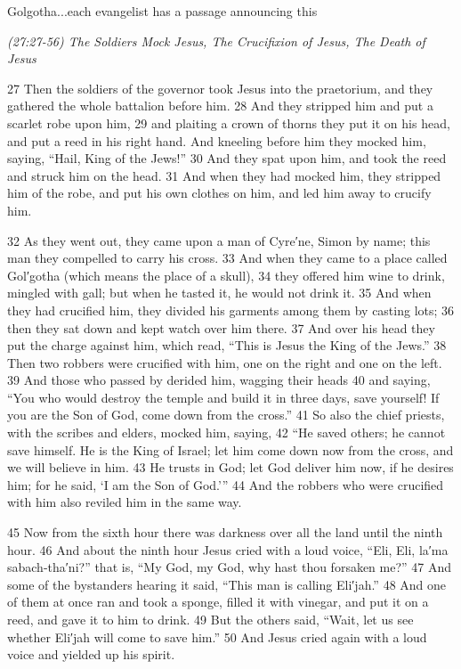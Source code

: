 \documentclass[letterpaper]{report}
\begin{document}
{\centering
	Golgotha...each evangelist has a passage announcing this
	
	\emph{(27:27-56) The Soldiers Mock Jesus, The Crucifixion of Jesus, The Death of Jesus}\\
}
\begin{multicols}{2}
27 Then the soldiers of the governor took Jesus into the praetorium, and they gathered the whole battalion before him. 28 And they stripped him and put a scarlet robe upon him, 29 and plaiting a crown of thorns they put it on his head, and put a reed in his right hand. And kneeling before him they mocked him, saying, “Hail, King of the Jews!” 30 And they spat upon him, and took the reed and struck him on the head. 31 And when they had mocked him, they stripped him of the robe, and put his own clothes on him, and led him away to crucify him.

32 As they went out, they came upon a man of Cyre′ne, Simon by name; this man they compelled to carry his cross. 33 And when they came to a place called Gol′gotha (which means the place of a skull), 34 they offered him wine to drink, mingled with gall; but when he tasted it, he would not drink it. 35 And when they had crucified him, they divided his garments among them by casting lots; 36 then they sat down and kept watch over him there. 37 And over his head they put the charge against him, which read, “This is Jesus the King of the Jews.” 38 Then two robbers were crucified with him, one on the right and one on the left. 39 And those who passed by derided him, wagging their heads 40 and saying, “You who would destroy the temple and build it in three days, save yourself! If you are the Son of God, come down from the cross.” 41 So also the chief priests, with the scribes and elders, mocked him, saying, 42 “He saved others; he cannot save himself. He is the King of Israel; let him come down now from the cross, and we will believe in him. 43 He trusts in God; let God deliver him now, if he desires him; for he said, ‘I am the Son of God.’” 44 And the robbers who were crucified with him also reviled him in the same way.

45 Now from the sixth hour there was darkness over all the land until the ninth hour. 46 And about the ninth hour Jesus cried with a loud voice, “Eli, Eli, la′ma sabach-tha′ni?” that is, “My God, my God, why hast thou forsaken me?” 47 And some of the bystanders hearing it said, “This man is calling Eli′jah.” 48 And one of them at once ran and took a sponge, filled it with vinegar, and put it on a reed, and gave it to him to drink. 49 But the others said, “Wait, let us see whether Eli′jah will come to save him.” 50 And Jesus cried again with a loud voice and yielded up his spirit.


\end{multicols}
\end{document}
